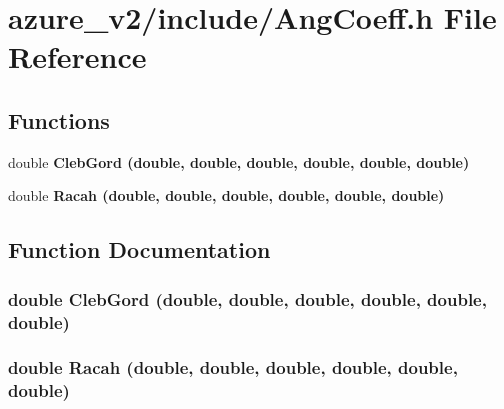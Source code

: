 \section{azure\_\-v2/include/Ang\-Coeff.h File Reference}
\label{AngCoeff_8h}
\subsection*{Functions}
\begin{CompactItemize}
\item 
double \bf{Cleb\-Gord} (double, double, double, double, double, double)
\item 
double \bf{Racah} (double, double, double, double, double, double)
\end{CompactItemize}


\subsection{Function Documentation}
\subsubsection{\setlength{\rightskip}{0pt plus 5cm}double Cleb\-Gord (double, double, double, double, double, double)}\label{AngCoeff_8h_a5f63f6543f67e0e419695cec7864f16}


\subsubsection{\setlength{\rightskip}{0pt plus 5cm}double Racah (double, double, double, double, double, double)}\label{AngCoeff_8h_4e669dc2f90d45d6f661fc5849ff2dea}


